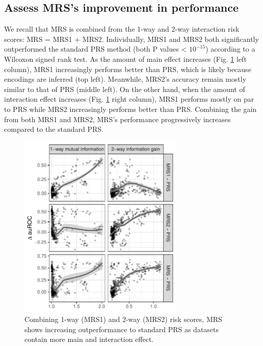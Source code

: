 \documentclass{ws-procs11x85}
\begin{document}
\hypertarget{assess-improvement-in-performance}{%
\subsection{Assess MRS's improvement in
performance}\label{assess-improvement-in-performance}}

We recall that MRS is combined from the 1-way and 2-way interaction risk scores: MRS = MRS1 + MRS2.
Individually, MRS1 and MRS2 both significantly outperformed the standard
PRS method (both P values \textless{} \(10^{-15}\)) according to a
Wilcoxon signed rank test. As the amount of main effect increases (Fig.
\ref{fig:improvements} left column), MRS1 increasingly performs better
than PRS, which is likely because encodings are inferred (top left).
Meanwhile, MRS2's accuracy remain mostly similar to that of PRS (middle
left). On the other hand, when the amount of interaction effect
increases (Fig. \ref{fig:improvements} right column), MRS1 performs
mostly on par to PRS while MRS2 increasingly performs better than PRS.
Combining the gain from both MRS1 and MRS2, MRS's performance
progressively increases compared to the standard PRS.

\begin{figure}
\centering
\includegraphics[width=0.7\textwidth]{images/improvements_train_ms.pdf}
\caption{Combining 1-way (MRS1) and 2-way (MRS2) risk scores, MRS shows
increasing outperformance to standard PRS as datasets contain more main
and interaction effect.\label{fig:improvements}}
\end{figure}
\end{document}
